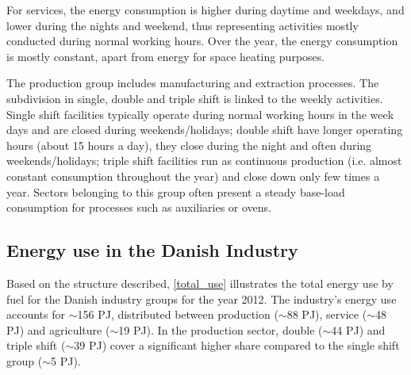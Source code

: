 \documentclass[review]{elsarticle}
\begin{document}
For services, the energy consumption is higher during daytime and weekdays, and lower during the nights and weekend, thus representing activities mostly conducted during normal working hours. Over the year, the energy consumption is mostly constant, apart from energy for space heating purposes.

The production group includes manufacturing and extraction processes. The subdivision in single, double and triple shift is linked to the weekly activities. Single shift facilities typically operate during normal working hours in the week days and are closed during weekends/holidays; double shift have longer operating hours (about 15 hours a day), they close during the night and often during weekends/holidays;
triple shift facilities run as continuous production (i.e. almost constant consumption throughout the year) and close down only few times a year. 
Sectors belonging to this group often present a steady base-load consumption for processes such as auxiliaries or ovens. \\


\subsection{Energy use in the Danish Industry}

Based on the structure described, \autoref{total_use} illustrates the total energy use by fuel for the Danish industry groups for the year 2012.
The industry's energy use accounts for $\sim$156 PJ, distributed between production ($\sim$88 PJ), service ($\sim$48 PJ) and agriculture ($\sim$19 PJ). In the production sector, double ($\sim$44 PJ) and triple shift ($\sim$39 PJ) cover a significant higher share compared to the single shift group ($\sim$5 PJ).
\end{document}
